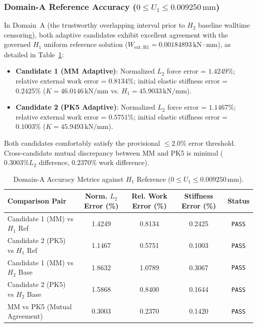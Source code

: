 \subsubsection{Domain-A Reference Accuracy ($0 \le U_1 \le 0.009250\,\text{mm}$)}
In Domain~A (the trustworthy overlapping interval prior to $H_2$ baseline walltime censoring), both adaptive candidates exhibit excellent agreement with the governed $H_1$ uniform reference solution ($W_{\mathrm{ext,H1}} = 0.00184893\,\text{kN}\cdot\text{mm}$), as detailed in Table~\ref{tab:stage_g_domain_a_acc}:
\begin{itemize}
    \item \textbf{Candidate 1 (MM Adaptive)}: Normalized $L_2$ force error = $\mathbf{1.4249\%}$; relative external work error = $\mathbf{0.8134\%}$; initial elastic stiffness error = $\mathbf{0.2425\%}$ ($K = 46.0146\,\text{kN/mm}$ vs. $H_1 = 45.9033\,\text{kN/mm}$).
    \item \textbf{Candidate 2 (PK5 Adaptive)}: Normalized $L_2$ force error = $\mathbf{1.1467\%}$; relative external work error = $\mathbf{0.5751\%}$; initial elastic stiffness error = $\mathbf{0.1003\%}$ ($K = 45.9493\,\text{kN/mm}$).
\end{itemize}
Both candidates comfortably satisfy the provisional $\le 2.0\%$ error threshold. Cross-candidate mutual discrepancy between MM and PK5 is minimal ($0.3003\% L_2$ difference, $0.2370\%$ work difference).

\begin{table}[htbp]
\centering
\small
\caption{Domain-A Accuracy Metrics against $H_1$ Reference ($0 \le U_1 \le 0.009250\,\text{mm}$).}
\label{tab:stage_g_domain_a_acc}
\begin{tabular}{lcccc}
\toprule
\textbf{Comparison Pair} & \textbf{Norm. $L_2$ Error (\%)} & \textbf{Rel. Work Error (\%)} & \textbf{Stiffness Error (\%)} & \textbf{Status} \\
\midrule
Candidate 1 (MM) vs $H_1$ Ref & 1.4249 & 0.8134 & 0.2425 & \texttt{PASS} \\
Candidate 2 (PK5) vs $H_1$ Ref & 1.1467 & 0.5751 & 0.1003 & \texttt{PASS} \\
Candidate 1 (MM) vs $H_2$ Base & 1.8632 & 1.0789 & 0.3067 & \texttt{PASS} \\
Candidate 2 (PK5) vs $H_2$ Base & 1.5868 & 0.8400 & 0.1644 & \texttt{PASS} \\
\midrule
MM vs PK5 (Mutual Agreement) & 0.3003 & 0.2370 & 0.1420 & \texttt{PASS} \\
\bottomrule
\end{tabular}
\end{table}

